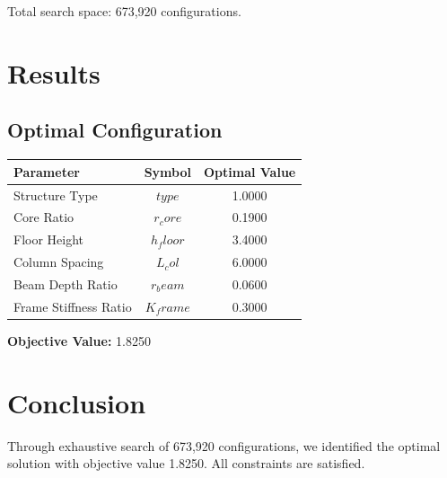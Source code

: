 \documentclass[11pt,a4paper]{article}
\begin{document}
Total search space: 673,920 configurations.

\section{Results}

\subsection{Optimal Configuration}

\begin{center}
\begin{tabular}{|l|c|c|}
\hline
Parameter & Symbol & Optimal Value \\
\hline
Structure Type & $type$ & 1.0000 \\
Core Ratio & $r_core$ & 0.1900 \\
Floor Height & $h_floor$ & 3.4000 \\
Column Spacing & $L_col$ & 6.0000 \\
Beam Depth Ratio & $r_beam$ & 0.0600 \\
Frame Stiffness Ratio & $K_frame$ & 0.3000 \\
\hline
\end{tabular}
\end{center}

\textbf{Objective Value:} 1.8250

\section{Conclusion}

Through exhaustive search of 673,920 configurations, we identified the optimal solution with objective value 1.8250. All constraints are satisfied.
\end{document}
